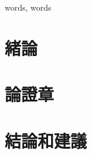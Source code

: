 \documentclass{format/MUSTThesisC}
\begin{document}
\mustEabstract
{

}
{words, words}



\mustcontents



\linespread{1.65}\selectfont


\chapter{緒論}

\chapter{論證章}

\chapter{結論和建議}






\bibreference{
	
}



\MUSTappendix{

}


\MUSTacknowledgement{

}















\def\mustProfilea{
	2019年5月10日
}


\def\mustProfileb{
	2010.11 $\sim$ 2011.11 \\ 
	2010.11 $\sim$ 2011.11
}


\def\mustProfilec{
	X~X~X~大學 \\ 
	X~X~X~大學
}


\def\mustProfiled{
	X~X~学士学位\\
	X~X~硕士学位
}


\def\mustProfilee{
	待写,待补
}


\def\mustProfilef{
	待写,待补
}



\MUSTProfile
\end{document}

